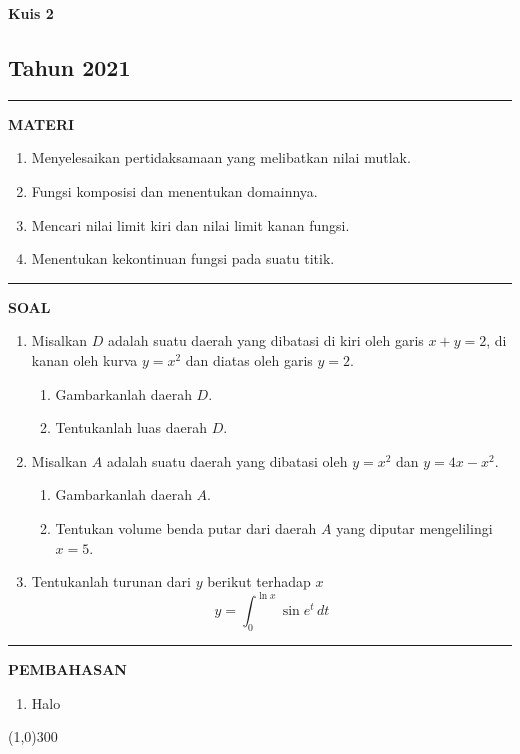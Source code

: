 \begin{flushright}
    \textbf{\Large{Kuis 2}}
    \subsection*{Tahun 2021}
\end{flushright}
\vspace{0.5cm}
\hrule height 2pt
\vspace{0.5cm}
\begin{center}
    \textbf{\large{MATERI}}
    \begin{enumerate}[leftmargin=*, label={\arabic*}.]
        \item Menyelesaikan pertidaksamaan yang melibatkan nilai mutlak.
        \item Fungsi komposisi dan menentukan domainnya.
        \item Mencari nilai limit kiri dan nilai limit kanan fungsi.
        \item Menentukan kekontinuan fungsi pada suatu titik.
    \end{enumerate}
\end{center}
\vspace{0.2cm}
\hrule height 1pt
\vspace{0.5cm}
\begin{center}
    \textbf{\large{SOAL}}
\end{center}
\begin{enumerate}[leftmargin=*, label={\arabic*}.]
\item Misalkan $D$ adalah suatu daerah yang dibatasi di kiri oleh garis $x+y=2$, 
di kanan oleh kurva $y=x^{2}$ dan diatas oleh garis $y=2$.
\begin{enumerate}[label={\alph*}.]
    \item Gambarkanlah daerah $D$.
    \item Tentukanlah luas daerah $D$.
\end{enumerate}
\item Misalkan $A$ adalah suatu daerah yang dibatasi oleh $y=x^{2}$ dan $y=4x-x^{2}$.
\begin{enumerate}[label={\alph*}.]
    \item Gambarkanlah daerah $A$.
    \item Tentukan volume benda putar dari daerah $A$ yang diputar mengelilingi $x=5$.
\end{enumerate}
\item Tentukanlah turunan dari $y$ berikut terhadap $x$
\[
y = \int_{0}^{\ln x}\sin e^{t}\,dt
\]
\end{enumerate}
\vspace{0.2cm}
\hrule height 1pt
\vspace{0.5cm}

\begin{center}
    \textbf{\large{PEMBAHASAN}}
\end{center}
\begin{enumerate}[leftmargin=*, label={\arabic*}.]
\item Halo
\end{enumerate}
\begin{center}
    \line(1,0){300}
\end{center}